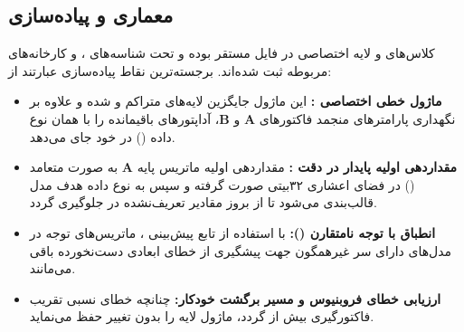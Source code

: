 \subsection{معماری و پیاده‌سازی}
کلاس‌های  و لایه اختصاصی  در فایل  مستقر بوده و تحت شناسه‌های ،  و کارخانه‌های مربوطه ثبت شده‌اند. برجسته‌ترین نقاط پیاده‌سازی عبارتند از:
\begin{itemize}
    \item \textbf{ماژول خطی اختصاصی :} این ماژول جایگزین لایه‌های متراکم و  شده و علاوه بر نگهداری پارامترهای منجمد فاکتورهای $\mathbf{A}$ و $\mathbf{B}$، آداپتورهای باقیمانده  را با همان نوع داده () در خود جای می‌دهد.
    \item \textbf{مقداردهی اولیه پایدار در دقت :} مقداردهی اولیه ماتریس پایه $\mathbf{A}$ به صورت متعامد () در فضای اعشاری ۳۲بیتی صورت گرفته و سپس به نوع داده هدف مدل قالب‌بندی می‌شود تا از بروز مقادیر تعریف‌نشده در  جلوگیری گردد.
    \item \textbf{انطباق با توجه نامتقارن ():} با استفاده از تابع پیش‌بینی ، ماتریس‌های توجه در مدل‌های دارای سر غیرهمگون جهت پیشگیری از خطای ابعادی دست‌نخورده باقی می‌مانند.
    \item \textbf{ارزیابی خطای فروبنیوس و مسیر برگشت خودکار:} چنانچه خطای نسبی تقریب فاکتورگیری بیش از  گردد، ماژول لایه را بدون تغییر حفظ می‌نماید.
\end{itemize}
